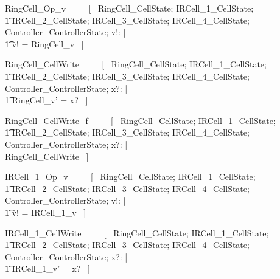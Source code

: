 \documentclass{article}
\begin{document}
\begin{zed}
RingCell\_Op\_v ~~~~ [~ 
    \Xi RingCell\_CellState; 
    \Xi IRCell\_1\_CellState; \\
    \t1 \Xi IRCell\_2\_CellState; 
    \Xi IRCell\_3\_CellState;
    \Xi IRCell\_4\_CellState; 
    \Xi Controller\_ControllerState; v!: \nat | \\
    \t1 v! = RingCell\_v ~] \\
\end{zed}

\begin{zed}
RingCell\_CellWrite ~~~~ [~ 
    \Delta RingCell\_CellState; 
    \Xi IRCell\_1\_CellState; \\
    \t1 \Xi IRCell\_2\_CellState; 
    \Xi IRCell\_3\_CellState;
    \Xi IRCell\_4\_CellState; 
    \Xi Controller\_ControllerState; 
    x?: \nat | \\
    \t1 RingCell\_v' = x? ~] \\
\end{zed}

\begin{zed}
RingCell\_CellWrite\_f ~~~~ [~ 
    \Xi RingCell\_CellState; 
    \Xi IRCell\_1\_CellState; \\
    \t1 \Xi IRCell\_2\_CellState; 
    \Xi IRCell\_3\_CellState;
    \Xi IRCell\_4\_CellState; 
    \Xi Controller\_ControllerState; 
    x?: \nat | \\
    \lnot \pre RingCell\_CellWrite ~] \\
\end{zed}

\begin{zed}
IRCell\_1\_Op\_v ~~~~ [~ 
    \Xi RingCell\_CellState; 
    \Xi IRCell\_1\_CellState; \\
    \t1 \Xi IRCell\_2\_CellState; 
    \Xi IRCell\_3\_CellState;
    \Xi IRCell\_4\_CellState; 
    \Xi Controller\_ControllerState; v!: \nat | \\
    \t1 v! = IRCell\_1\_v ~] \\
\end{zed}

\begin{zed}
IRCell\_1\_CellWrite ~~~~ [~ 
    \Xi RingCell\_CellState; 
    \Delta IRCell\_1\_CellState; \\
    \t1 \Xi IRCell\_2\_CellState; 
    \Xi IRCell\_3\_CellState;
    \Xi IRCell\_4\_CellState; 
    \Xi Controller\_ControllerState; 
    x?: \nat | \\
    \t1 IRCell\_1\_v' = x? ~] \\
\end{zed}
\end{document}
